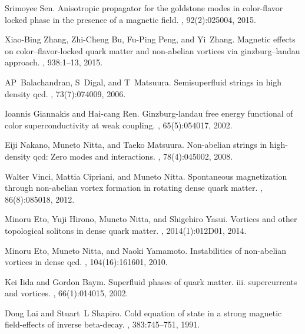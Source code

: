 \documentclass[prd, showpacs,nofootinbib,amsmath,amssymb]{revtex4}
\begin{document}
\begin{thebibliography}{99}
Srimoyee Sen.
\newblock Anisotropic propagator for the goldstone modes in color-flavor locked
  phase in the presence of a magnetic field.
, 92(2):025004, 2015.

Xiao-Bing Zhang, Zhi-Cheng Bu, Fu-Ping Peng, and Yi~Zhang.
\newblock Magnetic effects on color--flavor-locked quark matter and non-abelian
  vortices via ginzburg--landau approach.
, 938:1--13, 2015.

AP~Balachandran, S~Digal, and T~Matsuura.
\newblock Semisuperfluid strings in high density qcd.
, 73(7):074009, 2006.

Ioannis Giannakis and Hai-cang Ren.
\newblock Ginzburg-landau free energy functional of color superconductivity at
  weak coupling.
, 65(5):054017, 2002.

Eiji Nakano, Muneto Nitta, and Taeko Matsuura.
\newblock Non-abelian strings in high-density qcd: Zero modes and interactions.
, 78(4):045002, 2008.

Walter Vinci, Mattia Cipriani, and Muneto Nitta.
\newblock Spontaneous magnetization through non-abelian vortex formation in
  rotating dense quark matter.
, 86(8):085018, 2012.

Minoru Eto, Yuji Hirono, Muneto Nitta, and Shigehiro Yasui.
\newblock Vortices and other topological solitons in dense quark matter.
,
  2014(1):012D01, 2014.

Minoru Eto, Muneto Nitta, and Naoki Yamamoto.
\newblock Instabilities of non-abelian vortices in dense qcd.
, 104(16):161601, 2010.

Kei Iida and Gordon Baym.
\newblock Superfluid phases of quark matter. iii. supercurrents and vortices.
, 66(1):014015, 2002.

Dong Lai and Stuart~L Shapiro.
\newblock Cold equation of state in a strong magnetic field-effects of inverse
  beta-decay.
, 383:745--751, 1991.


\end{thebibliography}
\end{document}
